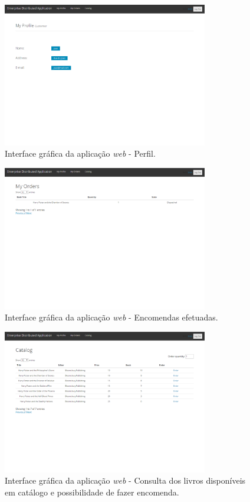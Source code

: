 \documentclass[12pt]{article}
\begin{document}
\begin{figure}[H]
    \centering
    \includegraphics[width=0.8\textwidth]{Web_Profile.png}
    \caption{Interface gráfica da aplicação \textit{web} - Perfil.}
    \label{fig:c9}
\end{figure}

\begin{figure}[H]
    \centering
    \includegraphics[width=0.8\textwidth]{Web_Orders.png}
    \caption{Interface gráfica da aplicação \textit{web} - Encomendas efetuadas.}
    \label{fig:c9}
\end{figure}

\begin{figure}[H]
    \centering
    \includegraphics[width=0.8\textwidth]{Web_Catalog.png}
    \caption{Interface gráfica da aplicação \textit{web} - Consulta dos livros disponíveis em catálogo e possibilidade de fazer encomenda.}
    \label{fig:c10}
\end{figure}
\end{document}

